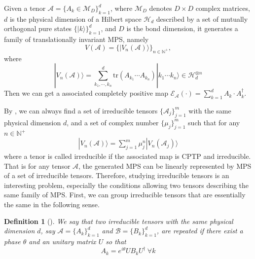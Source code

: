 \documentclass[journal]{IEEEtran}
\def\h{\ensuremath{\mathcal{H}}}
\def\a{\ensuremath{\mathcal{A}}}
\def\b{\ensuremath{\mathcal{B}}}
\def\e{\ensuremath{\mathcal{E}}}
\newtheorem{definition}{Definition}
\begin{document}
Given a  tenor $\a=\{A_{k}\in \mathcal{M}_D\}_{k=1}^{d}$, where $\mathcal{M}_{D}$ denotes $D\times D$ complex matrices, $d$ is the physical dimension of a Hilbert space $\h_d$ described by a set of mutually orthogonal pure states $\{|k\rangle\}_{k=1}^{d}$, and $D$ is the bond dimension, it generates a family of translationally invariant MPS, namely
$$V(\a)=\{|V_{n}(\a)\rangle\}_{n\in \mathbb{N^+}},$$
where $$|V_{n}(\a)\rangle=\sum_{k_1,\cdots,k_n}^{d}\textrm{tr}(A_{k_1}\cdots A_{k_n})|k_1\cdots k_{n}\rangle\in\h_d^{\otimes n}$$
Then we can get a associated completely positive map $\e_\a(\cdot)=\sum_{k=1}^{d}A_{k}\cdot A_{k}^\dagger$.

By \cite{cuevas2017irreducible}, we can always find a set of irreducible tensors $\{\a_{j}\}_{j=1}^{m}$ with the same physical dimension $d$, and a set of complex number $\{\mu_{j}\}_{j=1}^{m}$ such that for any $n\in\mathbb{N^{+}}$
\begin{eqnarray}\label{Eq_MPS}
  |V_n(\a)\rangle=\sum_{j=1}^{m}\mu_j^{n}|V_n(\a_{j})\rangle
\end{eqnarray}
where a tenor is called irreducible if the associated map is CPTP and irreducible. That is for any tensor $\a$,  the generated MPS can be linearly represented by MPS of a set of irreducible tensors. Therefore, studying irreducible tensors is an interesting problem, especially the conditions allowing two tensors describing the same family of
MPS.
First, we can group irreducible tensors that are essentially the same in the following sense.
\begin{definition}[\cite{cuevas2017irreducible}]
  We say that two irreducible tensors with the same physical dimension $d$, say $\a=\{A_{k}\}_{k=1}^{d}$ and $\b=\{B_{k}\}_{k=1}^{d}$, are repeated if there exist a phase $\theta$ and an unitary matrix $U$ so that 
  $$A_{k}=e^{i\theta}UB_kU^\dagger \ \forall k$$
\end{definition}
\end{document}
